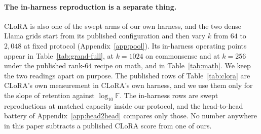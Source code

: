 \documentclass[11pt]{article}
\begin{document}
\paragraph{The in-harness reproduction is a separate thing.} CLoRA is also one
of the swept arms of our own harness, and the two dense Llama grids start from
its published configuration and then vary $k$ from $64$ to $2{,}048$ at fixed
protocol (Appendix~\ref{app:pool}). Its in-harness operating points appear in
Table~\ref{tab:grand-full}, at $k{=}1024$ on commonsense and at $k{=}256$
under the published rank-$64$ recipe on math, and in Table~\ref{tab:math}. We
keep the two readings apart on purpose. The published rows of
Table~\ref{tab:clora} are CLoRA's own measurement in CLoRA's own harness, and
we use them only for the slope of retention against $\log_{10}\mathbb{F}$. The
in-harness rows are swept reproductions at matched capacity inside our
protocol, and the head-to-head battery of Appendix~\ref{app:head2head}
compares only those. No number anywhere in this paper subtracts a published
CLoRA score from one of ours.
\end{document}
